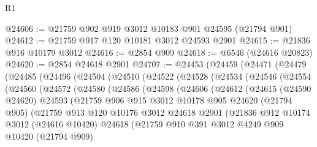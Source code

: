 \begin{lexlean}{R1}
\begin{coremodule}
@24606 := @21759 @902 @919 @3012 @10183 @901 @24595 (@21794 @901)
@24612 := @21759 @917 @120 @10181 @3012 @24593 @2901
@24615 := @21836 @916 @10179 @3012
@24616 := @2854 @909
@24618 := @6546 (@24616 @20823)
@24620 := @2854 @24618 @2901
@24707 := @24453
    (@24459
      (@24471
        (@24479
          (@24485
            (@24496
              (@24504
                (@24510
                  (@24522
                    (@24528
                      (@24534
                        (@24546
                          (@24554
                            (@24560
                              (@24572
                                (@24580
                                  (@24586
                                    (@24598
                                      (@24606
                                        (@24612
                                          (@24615
                                            (@24590 @24620)
                                            @24593
                                            (@21759
                                              @906
                                              @915
                                              @3012
                                              @10178
                                              @905
                                              @24620
                                              (@21794 @905)
                                              (@21759
                                                @913
                                                @120
                                                @10176
                                                @3012
                                                @24618
                                                @2901
                                                (@21836
                                                  @912
                                                  @10174
                                                  @3012
                                                  (@24616 @10420)
                                                  @24618
                                                  (@21759
                                                    @910
                                                    @391
                                                    @3012
                                                    @4249
                                                    @909
                                                    @10420
                                                    (@21794 @909)

\end{coremodule}
\end{lexlean}
